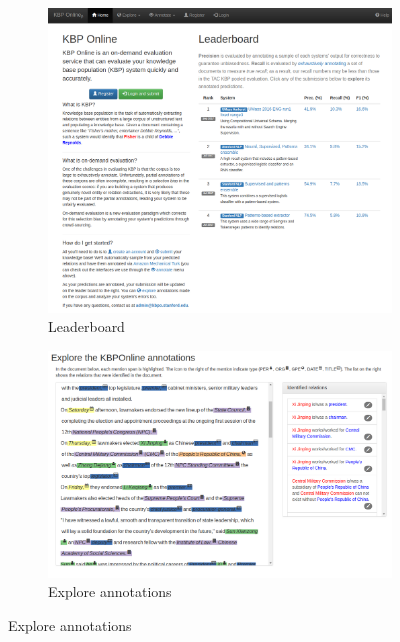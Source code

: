 \begin{figure}
  \centering
  \begin{subfigure}{0.8\textwidth}
    \includegraphics[width=\textwidth]{figures/interface/leaderboard}
    \caption{Leaderboard}
  \end{subfigure}

  \begin{subfigure}{0.8\textwidth}
    \includegraphics[width=\textwidth]{figures/interface/explore-data}
    \caption{Explore annotations}
  \end{subfigure}


\end{figure}
